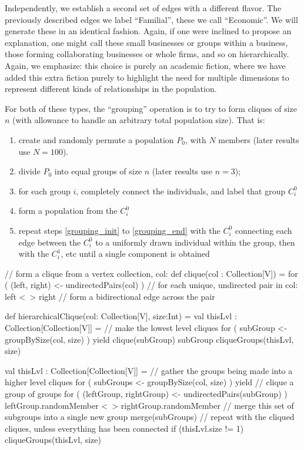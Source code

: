 \documentclass{article}
\begin{document}
Independently, we establish a second set of edges with a different flavor.  The previously described edges we label ``Familial'', these we call ``Economic''.  We will generate these in an identical fashion.  Again, if one were inclined to propose an explanation, one might call these small businesses or groups within a business, those forming collaborating businesses or whole firms, and so on hierarchically.  Again, we emphasize: this choice is purely an academic fiction, where we have added this extra fiction purely to highlight the need for multiple dimensions to represent different kinds of relationships in the population.

For both of these types, the ``grouping'' operation is to try to form cliques of size $n$ (with allowance to handle an arbitrary total population size).  That is:\begin{enumerate}
\item create and randomly permute a population $P_0$, with $N$ members (later results use $N=100$).
\item\label{grouping_init} divide $P_0$ into equal groups of size $n$ (later results use $n=3$);
\item for each group $i$, completely connect the individuals, and label that group $C_i^0$
\item\label{grouping_end} form a population from the $C_i^0$
\item repeat steps \ref{grouping_init} to \ref{grouping_end} with the $C_i^0$ connecting each edge between the $C_i^0$ to a uniformly drawn individual within the group, then with the $C_i^1$, etc until a single component is obtained
\end{enumerate}

\begin{code}[title=Pseudo-Code: Hierarchical Cliques]
// form a clique from a vertex collection, col:
def clique(col : Collection[V]) =
    for ( (left, right) <- undirectedPairs(col) ) // for each unique, undirected pair in col:
      left <~> right // form a bidirectional edge across the pair
      
def hierarchicalClique(col: Collection[V], size:Int) = 
   val thisLvl : Collection[Collection[V]] =
     // make the lowest level cliques 
     for ( subGroup <- groupBySize(col, size) ) yield {
       clique(subGroup)
       subGroup
     }
   cliqueGroups(thisLvl, size)
   
  val thisLvl : Collection[Collection[V]] =
    // gather the groups being made into a higher level cliques
    for ( subGroups <- groupBySize(col, size) ) yield {
      // clique a group of groups
      for ( (leftGroup, rightGroup) <- undirectedPairs(subGroup) ) {
        leftGroup.randomMember <~> rightGroup.randomMember
      }
      // merge this set of subgroups into a single new group
      merge(subGroups)
    }
  // repeat with the cliqued cliques, unless everything has been connected
  if (thisLvl.size != 1) cliqueGroups(thisLvl, size)  
\end{code}
\end{document}
